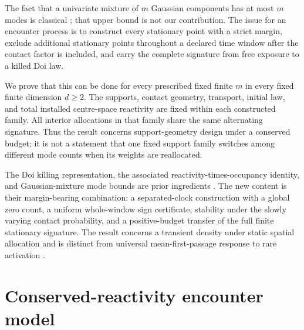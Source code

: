 \documentclass[aps,physrev,reprint,amsmath,amssymb,longbibliography,floatfix]{revtex4-2}
\begin{document}
The fact that a univariate mixture of \(m\) Gaussian components has at most
\(m\) modes is classical \cite{carreiraPerpinanWilliams2003modes,
amendolaEngstromHaase2020modes}; that upper bound is not our contribution.
The issue for an encounter process is to construct every stationary point
with a strict margin, exclude additional stationary points throughout a
declared time window after the contact factor is included, and carry the
complete signature from free exposure to a killed Doi law.

We prove that this can be done for every prescribed fixed finite \(m\) in
every fixed finite dimension \(d\ge2\).  The supports, contact geometry,
transport, initial law, and total installed centre-space reactivity are fixed
within each constructed family.  All interior allocations in that family
share the same alternating signature.  Thus the result concerns
support-geometry design under a conserved budget; it is not a statement that
one fixed support family switches among different mode counts when its
weights are reallocated.

The Doi killing representation, the associated reactivity-times-occupancy
identity, and Gaussian-mixture mode bounds are prior ingredients
\cite{doi1976stochastic,isaacsonMauroNewby2016uniform,
pruestelMeierSchellersheim2014area,bressloff2022feynmanKac}.  The new content
is their margin-bearing combination: a separated-clock construction with a
global zero count, a uniform whole-window sign certificate, stability under
the slowly varying contact probability, and a positive-budget transfer of
the full finite stationary signature.  The result concerns a transient
density under static spatial allocation and is distinct from universal
mean-first-passage response to rare activation
\cite{keidarReuveni2026linear}.

\section{Conserved-reactivity encounter model}
\label{sec:model}
\end{document}
